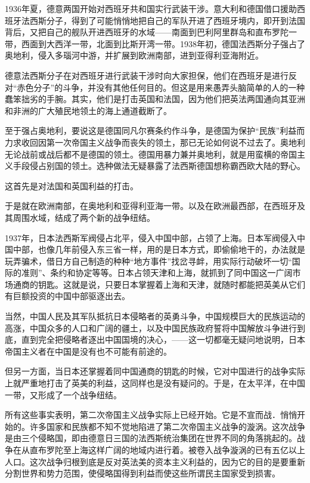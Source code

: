 1936年夏，德意两国开始对西班牙共和国实行武装干涉。意大利和德国借口援助西班牙法西斯分子，得到了可能悄悄地把自己的军队开进了西班牙境内，即开到法国背后，又把自己的舰队开进西班牙的水域——南面到巴利阿里群岛和直布罗陀一带，西面到大西洋一带，北面到比斯开湾一带。1938年初，德国法西斯分子强占了奥地利，侵入多瑙河中游，并扩展到欧洲南部，进到亚得利亚海附近。

德意法西斯分子在对西班牙进行武装干涉时向大家担保，他们在西班牙是进行反对“赤色分子”的斗争，并没有其他任何目的。但这是用来愚弄头脑简单的人的一种蠢笨拙劣的手腕。其实，他们是打击英国和法国，因为他们把英法两国通向其亚洲和非洲的广大殖民地领土的海上通道截断了。

至于强占奥地利，要说这是德国同凡尔赛条约作斗争，是德国为保护“民族”利益而力求收回因第一次帝国主义战争而丧失的领土，那已无论如何说不过去了。奥地利无论战前或战后都不是德国的领土。德国用暴力兼并奥地利，就是用蛮横的帝国主义手段侵占别国的领土。选种做法无疑暴露了法西斯德国想称霸西欧大陆的野心。

这首先是对法国和英国利益的打击。

于是就在欧洲南部，在奥地利和亚得利亚海一带。以及在欧洲最西部，在西班牙及其周围水域，结成了两个新的战争纽结。

1937年，日本法西斯军阀侵占北平，侵入中国中部，占领了上海。日本军阀侵入中国中部，也像几年前侵入东三省一样，用的是日本方式，即偷偷地干的，办法就是玩弄骗术，借日方自己制造的种种“地方事件”找岔寻衅，用实际行动破坏一切“国际的准则”、条约和协定等等。日本占领天津和上海，就抓到了同中国这一广阔市场通商的钥匙。这就是说，只要日本掌握着上海和天津，就随时都能把英美从它们有巨额投资的中国中部驱逐出去。

当然，中国人民及其军队抵抗日本侵略者的英勇斗争，中国规模巨大的民族运动的高涨，中国众多的人口和广阔的疆土，以及中国民族政府誓将中国解放斗争进行到底，直到完全把侵略者逐出中国国境的决心，——这一切都毫无疑问地说明，日本帝国主义者在中国是没有也不可能有前途的。

但另一方面，当日本还掌握着同中国通商的钥匙的时候，它对中国进行的战争实际上就严重地打击了英美的利益，这同样也是没有疑问的。于是，在太平洋，在中国一带，又形成了一个战争纽结。

所有这些事实表明，第二次帝国主义战争实际上已经开始。它是不宣而战．悄悄开始的。许多国家和民族都不知不觉地陷进了第二次帝国主义战争的漩涡。这次战争是由三个侵略国，即由德意日三国的法西斯统治集团在世界不同的角落挑起的。战争在从直布罗陀至上海这样广阔的地域内进行着。被卷入战争漩涡的已有五亿以上人口。这次战争归根到底是反对英法美的资本主义利益的，因为它的目的是要重新分割世界和势力范围，使侵略国得到利益而使这些所谓民主国家受到损害。

